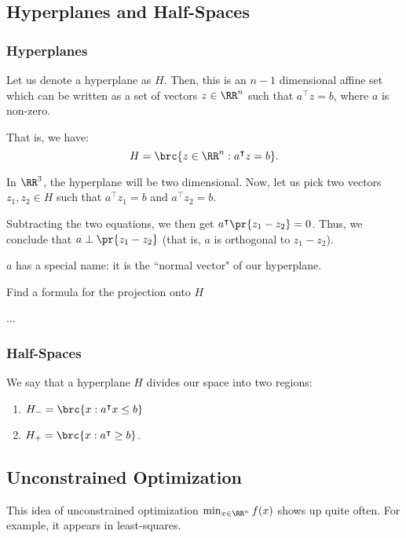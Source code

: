 \documentclass[openany]{book}
\begin{document}
\subsection{Hyperplanes and Half-Spaces}
\subsubsection{Hyperplanes}
\begin{defn}[Hyperplane]
	Let us denote a hyperplane as $H$. Then, this is an $n-1$ dimensional affine set which can be written as a set of vectors $z \in \RR^{n}$ such that $a^{\intercal}z = b$, where $a$ is non-zero.
	
	That is, we have:
	\begin{equation*}
		H = \brc{z \in \RR^{n} : a^{\intercal} z = b}.
	\end{equation*}
\end{defn}

\begin{example}[Hyperplane in $\RR^{3}$]
	In $\RR^{3}$, the hyperplane will be two dimensional. Now, let us pick two vectors $z_1, z_2 \in H$ such that $a^{\intercal} z_1 = b$ and $a^{\intercal} z_2 = b$.
	
	Subtracting the two equations, we then get $a^{\intercal}\pr{z_1 - z_2} = 0$. Thus, we conclude that $a \perp \pr{z_1 - z_2}$ (that is, $a$ is orthogonal to $z_1 - z_2$).
	
	$a$ has a special name: it is the ``normal vector" of our hyperplane.
\end{example}
\begin{hw}
	Find a formula for the projection onto $H$
\end{hw}
\begin{solution}
	...
\end{solution}

\subsubsection{Half-Spaces}
\begin{defn}
	We say that a hyperplane $H$ divides our space into two regions:
	\begin{enumerate}
		\item $H_- = \brc{x : a^{\intercal}x \leq b}$
		\item $H_+ = \brc{x : a^{\intercal} \geq b}$.
	\end{enumerate}
\end{defn}

\subsection{Unconstrained Optimization}
This idea of unconstrained optimization $\min_{x \in \RR^{n}} f(x)$ shows up quite often. For example, it appears in least-squares.
\end{document}
